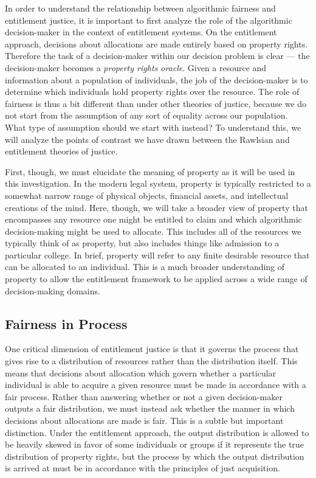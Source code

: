 In order to understand the relationship between algorithmic fairness and
entitlement justice, it is important to first analyze the role of the
algorithmic decision-maker in the context of entitlement systems. On the 
entitlement approach, decisions about allocations are made entirely based on
property rights. Therefore the task of a decision-maker within our decision
problem is clear — the decision-maker becomes a \emph{property rights oracle}.
Given a resource and information about a population of individuals, the job of
the decision-maker is to determine which individuals hold property rights over
the resource. The role of fairness is thus a bit different than under other
theories of justice, because we do not start from the assumption of any sort of
equality across our population. What type of assumption should we start with 
instead? To understand this, we will analyze the points of contrast we have
drawn between the Rawlsian and entitlement theories of justice.

First, though, we must elucidate the meaning of property as it will be used in
this investigation. In the modern legal system, property is typically restricted
to a somewhat narrow range of physical objects, financial assets, and 
intellectual creations of the mind. Here, though, we will take a broader view of
property that encompasses any resource one might be entitled to claim and which
algorithmic decision-making might be used to allocate. This includes all of the
resources we typically think of as property, but also includes things like
admission to a particular college. In brief, property will refer to any finite
desirable resource that can be allocated to an individual. This is a much
broader understanding of property to allow the entitlement framework to be 
applied across a wide range of decision-making domains.

\subsection{Fairness in Process}

One critical dimension of entitlement justice is that it governs the process
that gives rise to a distribution of resources rather than the distribution
itself. This means that decisions about allocation which govern whether a
particular individual is able to acquire a given resource must be made in
accordance with a fair process. Rather than answering whether or not a given
decision-maker outputs a fair distribution, we must instead ask whether the
manner in which decisions about allocations are made is fair. This is a
subtle but important distinction. Under the entitlement approach, the output
distribution is allowed to be heavily skewed in favor of some individuals or
groups if it represents the true distribution of property rights, but the
process by which the output distribution is arrived at must be in accordance
with the principles of just acquisition.

